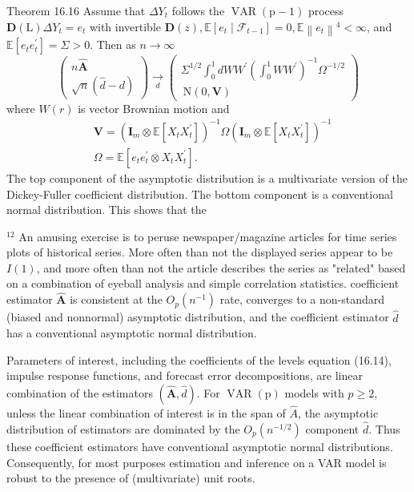 \documentclass[10pt]{article}
\begin{document}
Theorem 16.16 Assume that $\Delta Y_{t}$ follows the $\operatorname{VAR}(\mathrm{p}-1)$ process $\boldsymbol{D}(\mathrm{L}) \Delta Y_{t}=e_{t}$ with invertible $\boldsymbol{D}(z), \mathbb{E}\left[e_{t} \mid \mathscr{F}_{t-1}\right]=0, \mathbb{E}\left\|e_{t}\right\|^{4}<\infty$, and $\mathbb{E}\left[e_{t} e_{t}^{\prime}\right]=\Sigma>0$. Then as $n \rightarrow \infty$
$$
\left(\begin{array}{c}
n \widehat{\boldsymbol{A}} \\
\sqrt{n}(\widehat{d}-d)
\end{array}\right) \underset{d}{\longrightarrow}\left(\begin{array}{c}
\Sigma^{1 / 2} \int_{0}^{1} d W W^{\prime}\left(\int_{0}^{1} W W^{\prime}\right)^{-1} \Omega^{-1 / 2} \\
\mathrm{~N}(0, \boldsymbol{V})
\end{array}\right)
$$
where $W(r)$ is vector Brownian motion and
$$
\begin{aligned}
&\boldsymbol{V}=\left(\boldsymbol{I}_{m} \otimes \mathbb{E}\left[X_{t} X_{t}^{\prime}\right]\right)^{-1} \Omega\left(\boldsymbol{I}_{m} \otimes \mathbb{E}\left[X_{t} X_{t}^{\prime}\right]\right)^{-1} \\
&\Omega=\mathbb{E}\left[e_{t} e_{t}^{\prime} \otimes X_{t} X_{t}^{\prime}\right] .
\end{aligned}
$$
The top component of the asymptotic distribution is a multivariate version of the Dickey-Fuller coefficient distribution. The bottom component is a conventional normal distribution. This shows that the

${ }^{12}$ An amusing exercise is to peruse newspaper/magazine articles for time series plots of historical series. More often than not the displayed series appear to be $I(1)$, and more often than not the article describes the series as "related" based on a combination of eyeball analysis and simple correlation statistics. coefficient estimator $\widehat{\boldsymbol{A}}$ is consistent at the $O_{p}\left(n^{-1}\right)$ rate, converges to a non-standard (biased and nonnormal) asymptotic distribution, and the coefficient estimator $\widehat{d}$ has a conventional asymptotic normal distribution.

Parameters of interest, including the coefficients of the levels equation (16.14), impulse response functions, and forecast error decompositions, are linear combination of the estimators $(\widehat{\boldsymbol{A}}, \widehat{d})$. For $\operatorname{VAR}(\mathrm{p})$ models with $p \geq 2$, unless the linear combination of interest is in the span of $\widehat{A}$, the asymptotic distribution of estimators are dominated by the $O_{p}\left(n^{-1 / 2}\right)$ component $\widehat{d}$. Thus these coefficient estimators have conventional asymptotic normal distributions. Consequently, for most purposes estimation and inference on a VAR model is robust to the presence of (multivariate) unit roots.
\end{document}
